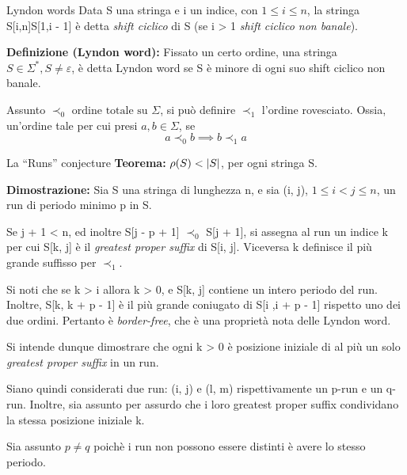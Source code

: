 \documentclass{beamer}
\begin{document}
    \begin{frame}{Lyndon words}
        Data S una stringa e i un indice, con \(1 \le i \le n\),
        la stringa S[i,n]S[1,i - 1] è detta \emph{shift ciclico} di S 
        (se i > 1 \emph{shift ciclico non banale}).

        \textbf{Definizione (Lyndon word): } Fissato un certo ordine, 
        una stringa \(S \in \Sigma^{*}, S \ne \varepsilon\),
        è detta Lyndon word se S è minore di ogni suo shift ciclico non banale.
    \end{frame}
    \begin{frame}        
        Assunto \(\prec_{0} \text{ ordine totale su } \Sigma\), 
        si può definire \(\prec_{1}\) l'ordine rovesciato. 
        Ossia, un'ordine tale per cui presi \(a, b \in \Sigma\), se 
        \[
            a \prec_{0} b \implies b \prec_{1} a
        \]
    \end{frame}
    \begin{frame}{La ``Runs'' conjecture}
        \textbf{Teorema: } \(\rho(S) < \left\lvert S \right\rvert\), per ogni stringa S.

        \textbf{Dimostrazione: } Sia S una stringa di lunghezza n,
        e sia (i, j), \(1 \le i < j \le n\), un run di periodo minimo p in S.

        Se j + 1 < n, ed inoltre S[j - p + 1] \(\prec_{0}\) S[j + 1],
        si assegna al run un indice k per cui S[k, j] è il \emph{greatest proper suffix}
        di S[i, j]. Viceversa k definisce il più grande suffisso per \(\prec_{1}\).

        Si noti che se k > i allora k > 0, e S[k, j] contiene un intero periodo del run.
        Inoltre, S[k, k + p - 1] è il più grande coniugato di S[i ,i + p - 1]
        rispetto uno dei due ordini. 
        Pertanto è \emph{border-free}, che è una proprietà nota delle Lyndon word.
    \end{frame}
    \begin{frame}
        Si intende dunque dimostrare che ogni k > 0 è posizione iniziale 
        di al più un solo \emph{greatest proper suffix} in un run.

        Siano quindi considerati due run: (i, j) e (l, m) rispettivamente
        un p-run e un q-run. Inoltre, sia assunto per assurdo che 
        i loro greatest proper suffix condividano la stessa posizione iniziale k.

        Sia assunto \(p \ne q\) poichè i run non possono essere distinti è avere lo stesso periodo.
    \end{frame}
\end{document}
